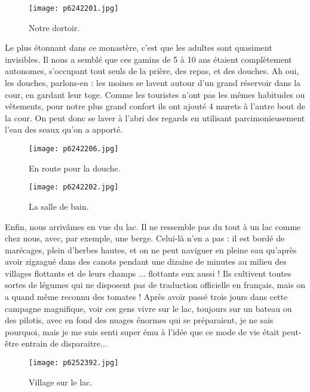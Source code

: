 \documentclass{book}
\begin{document}
\begin{figure}[h]
\centering
\texttt{[image: p6242201.jpg]}
\caption*{Notre dortoir.}
\end{figure}

Le plus étonnant dans ce monastère, c'est que les adultes sont quasiment invisibles. Il nous a semblé que ces gamins de 5 à 10 ans étaient complètement autonomes, s'occupant tout seuls de la prière, des repas, et des douches. Ah oui, les douches, parlons-en : les moines se lavent autour d'un grand réservoir dans la cour, en gardant leur toge. Comme les touristes n'ont pas les mêmes habitudes ou vêtements, pour notre plus grand confort ils ont ajouté 4 murets à l'autre bout de la cour. On peut donc se laver à l'abri des regards en utilisant parcimonieusement l'eau des seaux qu'on a apporté.




\begin{figure}[h]
\centering
\texttt{[image: p6242206.jpg]}
\caption*{En route pour la douche.}
\end{figure}


\begin{figure}[h]
\centering
\texttt{[image: p6242202.jpg]}
\caption*{La salle de bain.}
\end{figure}

Enfin, nous arrivâmes en vue du lac. Il ne ressemble pas du tout à un lac comme chez nous, avec, par exemple, une berge. Celui-là n'en a pas : il est bordé de marécages, plein d'herbes hautes, et on ne peut naviguer en pleine eau qu'après avoir zigzagué dans des canots pendant une dizaine de minutes au milieu des villages flottants et de leurs champs ... flottants eux aussi ! Ils cultivent toutes sortes de légumes qui ne disposent pas de traduction officielle en français, mais on a quand même reconnu des tomates ! Après avoir passé trois jours dans cette campagne magnifique, voir ces gens vivre sur le lac, toujours sur un bateau ou des pilotis, avec en fond des nuages énormes qui se préparaient, je ne sais pourquoi, mais je me suis senti super ému à l'idée que ce mode de vie était peut-être entrain de disparaitre...






\begin{figure}[h]
\centering
\texttt{[image: p6252392.jpg]}
\caption*{Village sur le lac.}
\end{figure}
\end{document}
